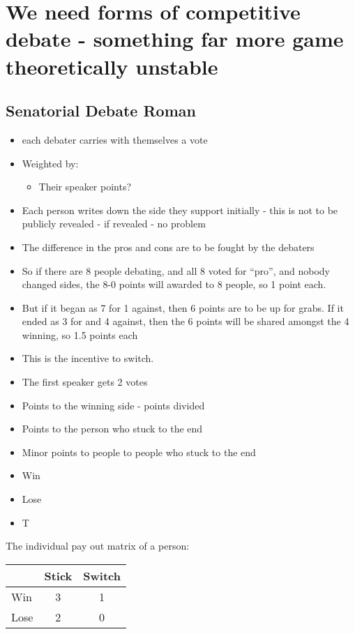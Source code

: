 \section{We need forms of competitive debate - something far more game theoretically unstable}

\subsection{Senatorial Debate Roman}

\begin{itemize}
    \item each debater carries with themselves a vote
    \item Weighted by:
    \begin{itemize}
        \item Their speaker points?
    \end{itemize}
    \item Each person writes down the side they support initially - this is not to be publicly revealed - if revealed - no problem
    \item The difference in the pros and cons are to be fought by the debaters
    \item So if there are 8 people debating, and all 8 voted for ``pro'', and nobody changed sides, the 8-0 points will awarded to 8 people, so 1 point each.
    \item But if it began as 7 for 1 against, then 6 points are to be up for grabs. If it ended as 3 for and 4 against, then the 6 points will be shared amongst the 4 winning, so 1.5 points each
    \item This is the incentive to switch.
    \item The first speaker gets 2 votes
    \item Points to the winning side - points divided
    \item Points to the person who stuck to the end
    \item Minor points to people to people who stuck to the end
    \item Win
    \item Lose
    \item T
\end{itemize}

The individual pay out matrix of a person:

\begin{table}[h]
\centering
\begin{tabular}{l|cc}
\toprule
 & Stick & Switch \\
\midrule
Win & 3 & 1 \\
Lose & 2 & 0 \\
\bottomrule
\end{tabular}
\end{table}

